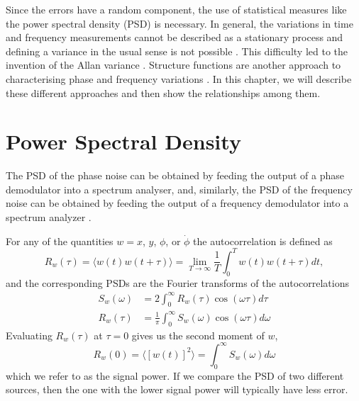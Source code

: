 Since the errors have a random component, the use of statistical measures like the power spectral density (PSD) is necessary. In general, the variations in time and frequency measurements cannot be described as a stationary process and defining a variance in the usual sense is not possible \cite{Allan1974, blair1974time}. This difficulty led to the invention of the Allan variance \cite{Allan1974, blair1974time}. Structure functions are another approach to characterising phase and frequency variations \cite{Lindsey1976}. In this chapter, we will describe these different approaches and then show the relationships among them.

\section{Power Spectral Density} \label{sec:psd}

The PSD of the phase noise can be obtained by feeding the output of a phase demodulator into a spectrum analyser, and, similarly, the PSD of the frequency noise can be obtained by feeding the output of a frequency demodulator into a spectrum analyzer \cite{blair1974time}.

For any of the quantities $w=x$, $y$, $\phi$, or $\dot{\phi}$ the autocorrelation is defined as
%
\begin{equation}
\label{eq:autocorr}
R_w(\tau) = \langle w(t)w(t+\tau) \rangle = \lim\limits_{T\to\infty}\frac{1}{T}\int_{0}^{T} w(t)w(t+\tau)dt,
\end{equation}
%
and the corresponding PSDs are the Fourier transforms of the autocorrelations
%
\begin{align}
S_w(\omega) &= 2\int_0^\infty R_w(\tau)\cos(\omega\tau)d\tau \\
R_w(\tau) &= \frac{1}{\pi}\int_0^\infty S_w(\omega)\cos(\omega\tau)d\omega
\end{align}
%
Evaluating $R_w(\tau)$ at $\tau = 0$ gives us the second moment of $w$, 
%
\begin{equation*}
R_w(0) = \langle [w(t)]^2 \rangle = \int_0^\infty S_w(\omega) d\omega
\end{equation*}
%
which we refer to as the signal power. If we compare the PSD of two different sources, then the one with the lower signal power will typically have less error.

